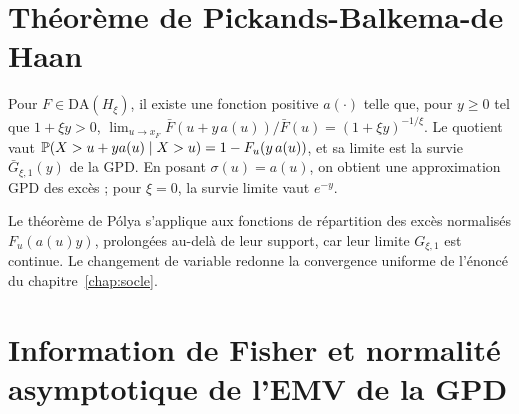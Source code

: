 \section{Théorème de Pickands-Balkema-de Haan}
\label{soc:ann:balkema}

Pour $F\in\mathrm{DA}(H_\xi)$, il existe une fonction positive $a(\cdot)$ telle que, pour $y\ge0$ tel que $1+\xi y>0$,
$\lim_{u\to x_F}\bar F(u+y\,a(u))/\bar F(u)=(1+\xi y)^{-1/\xi}$. Le quotient vaut
$\mathbb{P}(X>u+ya(u)\mid X>u)=1-F_u(y\,a(u))$, et sa limite est la survie $\bar G_{\xi,1}(y)$ de la GPD. En
posant $\sigma(u)=a(u)$, on obtient une approximation GPD des excès ; pour $\xi=0$, la survie limite vaut $e^{-y}$.

Le théorème de Pólya s'applique aux fonctions de répartition des excès normalisés
$F_u(a(u)y)$, prolongées au-delà de leur support, car leur limite $G_{\xi,1}$ est continue.
Le changement de variable redonne la convergence uniforme de l'énoncé du chapitre~\ref{chap:socle}.

\section{Information de Fisher et normalité asymptotique de l'EMV de la GPD}
\label{soc:ann:fisher}

